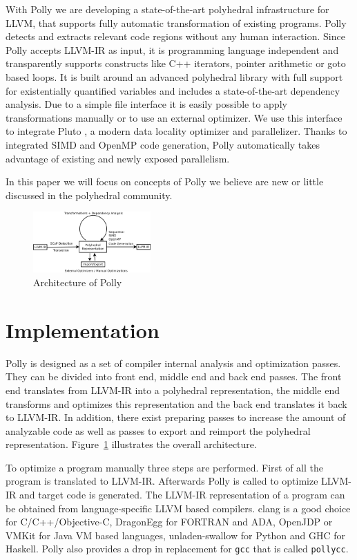 \documentclass{acm_proc_article-sp}
\begin{document}
With Polly we are developing a state-of-the-art polyhedral infrastructure for
LLVM, that supports fully automatic transformation of existing programs. Polly
detects and extracts relevant code regions without any human interaction. Since
Polly accepts LLVM-IR as input, it is programming language independent and
transparently supports constructs like C++ iterators, pointer arithmetic or
goto based loops. It is built around an advanced polyhedral library with full
support for existentially quantified variables and includes a state-of-the-art
dependency analysis. Due to a simple file interface it is easily possible to
apply transformations manually or to use an external optimizer. We use this
interface to integrate Pluto \cite{uday08pldi}, a modern data locality
optimizer and parallelizer. Thanks to integrated SIMD and OpenMP code
generation, Polly automatically takes advantage of existing and newly exposed
parallelism.

In this paper we will focus on concepts of Polly we believe are new
or little discussed in the polyhedral community.

\begin{figure}
	\label{fig:architecture}
	\includegraphics[width=0.4\textwidth]{images/architecture}
	\caption{Architecture of Polly}
\end{figure}

\section{Implementation}

Polly is designed as a set of compiler internal analysis and optimization
passes. They can be divided into front end, middle end and back end passes. The
front end translates from LLVM-IR into a polyhedral representation, the middle
end transforms and optimizes this representation and the back end translates it
back to LLVM-IR. In addition, there exist preparing passes to increase the
amount of analyzable code as well as passes to export and reimport the polyhedral
representation.  Figure~\ref{fig:architecture} illustrates the overall
architecture.

To optimize a program manually three steps are performed. First of all the
program is translated to LLVM-IR. Afterwards Polly is called to optimize LLVM-IR and
target code is generated. The LLVM-IR representation of a program can
be obtained from language-specific LLVM based compilers. clang is a
good choice for C/C++/Objective-C, DragonEgg for FORTRAN and ADA, OpenJDP or
VMKit for Java VM based languages, unladen-swallow for Python and GHC for
Haskell. Polly also provides a drop in replacement for \texttt{gcc} that is
called \texttt{pollycc}.
\end{document}
